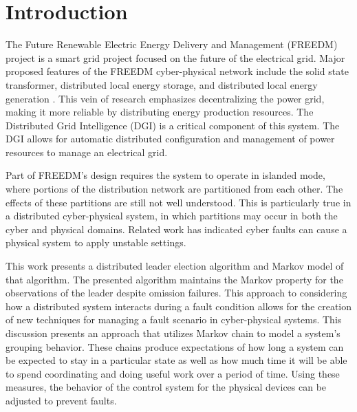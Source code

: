 
\section{Introduction}

The Future Renewable Electric Energy Delivery and Management (FREEDM) project is a smart grid project focused on the future of the electrical grid.
Major proposed features of the FREEDM cyber-physical network include the solid state transformer, distributed local energy storage, and distributed local energy generation \cite{FREEDMMIGRATION}.
This vein of research emphasizes decentralizing the power grid, making it more reliable by distributing energy production resources.
The Distributed Grid Intelligence (DGI) is a critical component of this system.
The DGI allows for automatic distributed configuration and  management of power resources to manage an electrical grid.

Part of FREEDM's design requires the system to operate in islanded mode, where portions of the distribution network are partitioned from each other.
The effects of these partitions are still not well understood.
This is particularly true in a distributed cyber-physical system, in which partitions may occur in both the cyber and physical domains.
Related work\cite{HARINI}\cite{TSG} has indicated cyber faults can cause a physical system to apply unstable settings.

This work presents a distributed leader election algorithm and Markov model of that algorithm.
The presented algorithm maintains the Markov property for the observations of the leader despite omission failures.
This approach to considering how a distributed system interacts during a fault condition allows for the creation of new techniques for managing a fault scenario in cyber-physical systems. 
This discussion presents an approach that utilizes Markov chain to model a system's grouping behavior.
These chains produce expectations of how long a system can be expected to stay in a particular state as well as how much time it will be able to spend coordinating and doing useful work over a period of time. 
Using these measures, the behavior of the control system for the physical devices can be adjusted to prevent faults.
